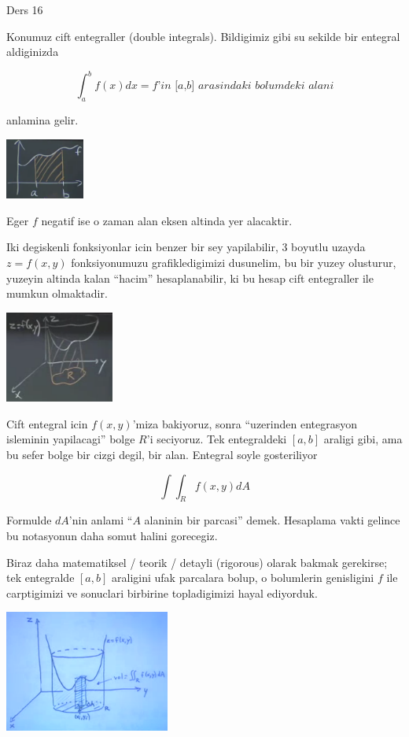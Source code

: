\documentclass[12pt,fleqn]{article}
\begin{document}
Ders 16

Konumuz cift entegraller (double integrals). Bildigimiz gibi su sekilde bir
entegral aldiginizda

\[ \int_a^bf(x)dx = \textit{f'in [a,b] arasindaki bolumdeki alani} \]

anlamina gelir. 

\includegraphics[height=2cm]{16_1.png}

Eger $f$ negatif ise o zaman alan eksen altinda yer alacaktir. 

Iki degiskenli fonksiyonlar icin benzer bir sey yapilabilir, 3 boyutlu
uzayda $z=f(x,y)$ fonksiyonumuzu grafikledigimizi dusunelim, bu bir yuzey olusturur,
yuzeyin altinda kalan ``hacim'' hesaplanabilir, ki bu hesap cift
entegraller ile mumkun olmaktadir. 

\includegraphics[height=3cm]{16_2.png}

Cift entegral icin $f(x,y)$'miza bakiyoruz, sonra ``uzerinden entegrasyon
isleminin yapilacagi'' bolge $R$'i seciyoruz. Tek entegraldeki $[a,b]$
araligi gibi, ama bu sefer bolge bir cizgi degil, bir alan. Entegral soyle
gosteriliyor 

\[ \int \int_R f(x,y) dA \]

Formulde $dA$'nin anlami ``$A$ alaninin bir parcasi'' demek. Hesaplama
vakti gelince bu notasyonun daha somut halini gorecegiz. 

Biraz daha matematiksel / teorik / detayli (rigorous) olarak bakmak
gerekirse; tek entegralde $[a,b]$ araligini ufak parcalara bolup, o
bolumlerin genisligini $f$ ile carptigimizi ve sonuclari birbirine
topladigimizi hayal ediyorduk. 

\includegraphics[height=4cm]{16_3.png}
\end{document}
